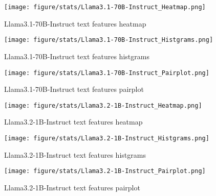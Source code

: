 
\begin{figure}[H]
    \centering
    \texttt{[image: figure/stats/Llama3.1-70B-Instruct\_Heatmap.png]}
    \caption{Llama3.1-70B-Instruct text features heatmap}
    \label{fig:human_heatmap}
\end{figure}


\begin{figure}[H]
    \centering
    \texttt{[image: figure/stats/Llama3.1-70B-Instruct\_Histgrams.png]}
    \caption{Llama3.1-70B-Instruct text features histgrams}
    \label{fig:human_hist}
\end{figure}


\begin{figure}[H]
    \centering
    \texttt{[image: figure/stats/Llama3.1-70B-Instruct\_Pairplot.png]}
    \caption{Llama3.1-70B-Instruct text features pairplot}
    \label{fig:human_pairplot}
\end{figure}




\begin{figure}[H]
    \centering
    \texttt{[image: figure/stats/Llama3.2-1B-Instruct\_Heatmap.png]}
    \caption{Llama3.2-1B-Instruct text features heatmap}
    \label{fig:human_heatmap}
\end{figure}

\begin{figure}[H]
    \centering
    \texttt{[image: figure/stats/Llama3.2-1B-Instruct\_Histgrams.png]}
    \caption{Llama3.2-1B-Instruct text features histgrams}
    \label{fig:human_hist}
\end{figure}


\begin{figure}[H]
    \centering
    \texttt{[image: figure/stats/Llama3.2-1B-Instruct\_Pairplot.png]}
    \caption{Llama3.2-1B-Instruct text features pairplot}
    \label{fig:human_pairplot}
\end{figure}



